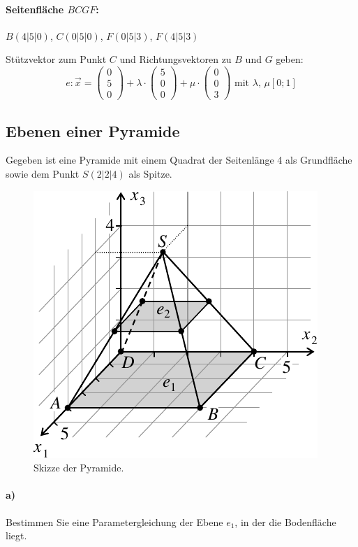 \documentclass{ajc}
\numberwithin{equation}{subsection}
\begin{document}
	\paragraph{Seitenfläche $BCGF$:} $B(4|5|0)$, $C(0|5|0)$, $F(0|5|3)$, $F(4|5|3)$
	
	Stützvektor zum Punkt $C$ und Richtungsvektoren zu $B$ und $G$ geben:
	\begin{equation}
		e: \overrightarrow{x} = \left(\begin{array}{r} 0 \\ 5 \\ 0\end{array}\right) + \lambda \cdot \left(\begin{array}{r} 5 \\ 0 \\ 0\end{array}\right) + \mu \cdot \left(\begin{array}{r} 0 \\ 0 \\ 3\end{array}\right) \text{ mit } \lambda,\,\mu \left[0;1\right]
	\end{equation}
	
	\subsection{Ebenen einer Pyramide}
	Gegeben ist eine Pyramide mit einem Quadrat der Seitenlänge 4 als Grundfläche sowie dem Punkt $S(2|2|4)$ als Spitze.
	\begin{figure}[ht]
		\centering
		\includegraphics[width=.5\textwidth]{ma_006_pyramidepg.pdf}
		\caption{Skizze der Pyramide.}
		\label{fig:006_pyramidepg}
	\end{figure}
	
	\paragraph{a)} Bestimmen Sie eine Parametergleichung der Ebene $e_1$, in der die Bodenfläche liegt. 
	
\end{document}
